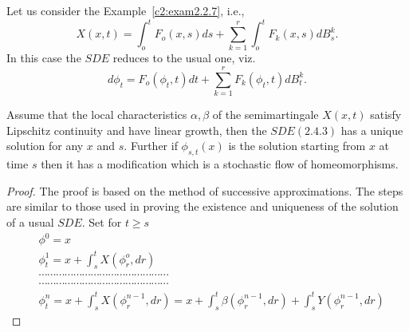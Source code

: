 \setcounter{example}{1}
\begin{example}%
Let us consider the Example~\ref{c2:exam2.2.7}, i.e., 
$$
X(x,t)= \int^t_o F_o(x,s)ds+ \sum^{r}_{k=1}\int^t_o F_k(x,s)dB^k_s.
$$
In this case the $SDE$ reduces to the usual one, viz.
$$
d\phi_t =F_o (\phi_t,t)dt+\sum^{r}_{k=1}F_k(\phi_t,t)dB^k_t.
$$
\end{example}

\setcounter{theorem}{2}
\begin{theorem}\label{c2:thm2.4.3}%
  Assume that the local characteristics $\alpha, \beta$ of the
  semimartingale $X(x, t)$ satisfy Lipschitz continuity and have
  linear growth, then the $SDE(2.4.3)$ has a unique solution for any
  $x$ and $s$. Further if $\phi_{s,t}(x)$ is the solution starting
  from $x$ at time $s$ then it has a modification which is a
  stochastic flow of homeomorphisms. 
\end{theorem}

\begin{proof}
  The proof is based on the method of successive approximations. The
  steps are similar to those used in proving the existence and
  uniqueness of the solution of a usual $SDE$. Set for $t \geq s$ 
  \begin{align*}
    & \phi^0=x\\ 
    & \phi^1_t = x+\int^t_s X(\phi^o_r,dr)\\
    & \cdots\cdots\cdots\cdots\cdots\cdots\cdots\cdots
    \cdots\cdots\cdots\cdots\cdots\cdots\cdots\\  
    & \cdots\cdots\cdots\cdots\cdots\cdots\cdots\cdots
    \cdots\cdots\cdots\cdots\cdots\cdots\cdots\\ 
    & \phi^n_t = x+\int^t_s X(\phi^{n-1}_r,dr)=x+\int^t_s
    \beta(\phi^{n-1}_r,dr)+\int^t_s Y(\phi^{n-1}_r,dr) 
  \end{align*}\pageoriginale 
\end{proof}

